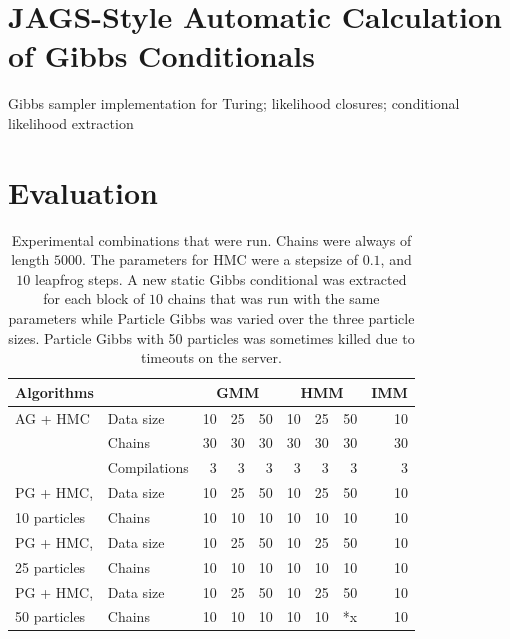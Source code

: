 



\section{JAGS-Style Automatic Calculation of Gibbs Conditionals}
\label{sec:jags-style-conditionals}

Gibbs sampler implementation for Turing; likelihood closures; conditional likelihood extraction


\section{Evaluation}
\label{sec:autogibbs-eval}

\begin{table}[t]
  \centering
  \libertineTabular
  \begin{tabular*}{\textwidth}{llrrrrrrr}
    \toprule
    Algorithms & & \multicolumn{3}{c}{GMM} & \multicolumn{3}{c}{HMM} & \multicolumn{1}{c}{IMM} \\
    \midrule
    AG + HMC & Data size & 10 & 25 & 50 & 10 & 25 & 50 & 10 \\
    & Chains & 30 & 30 & 30 & 30 & 30 & 30 & 30 \\
    & Compilations & 3 & 3 & 3 & 3 & 3 & 3 & 3\\
    \addlinespace
    PG + HMC, & Data size & 10 & 25 & 50 & 10 & 25 & 50 & 10 \\
    10 particles & Chains & 10 & 10 & 10 & 10 & 10 & 10 & 10 \\
    \addlinespace
    PG + HMC, & Data size & 10 & 25 & 50 & 10 & 25 & 50 & 10 \\
    25 particles & Chains & 10 & 10 & 10 & 10 & 10 & 10 & 10 \\
    \addlinespace
    PG + HMC, & Data size & 10 & 25 & 50 & 10 & 25 & 50 & 10 \\
    50 particles & Chains & 10 & 10 & 10 & 10 & 10 & *x & 10 \\
    \bottomrule
  \end{tabular*}
  \caption{Experimental combinations that were run.  Chains were always of length \(5000\).  The
    parameters for HMC were a stepsize of \(0.1\), and \(10\) leapfrog steps.  A new static Gibbs
    conditional was extracted for each block of \(10\) chains that was run with the same parameters
    while Particle Gibbs was varied over the three particle sizes.  Particle Gibbs with 50 particles
    was sometimes killed due to timeouts on the server.}
  \label{tab:autogibbs-params}
\end{table}

